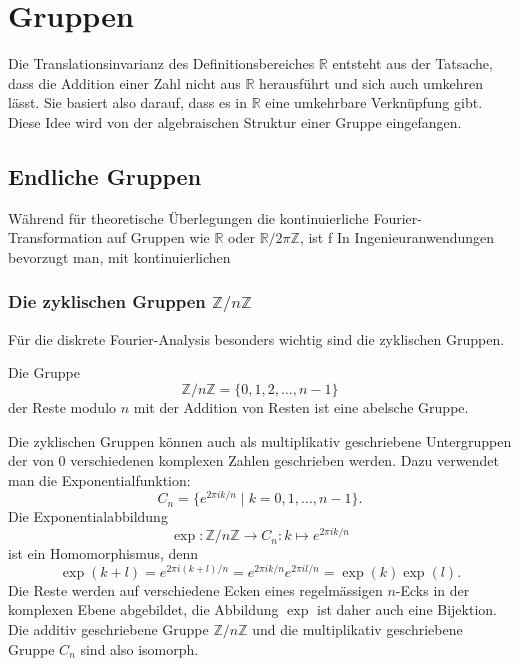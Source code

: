 %
%
%
\section{Gruppen
\label{buch:gruppen:section:gruppe}}
Die Translationsinvarianz des Definitionsbereiches $\mathbb{R}$
entsteht aus der Tatsache, dass die Addition einer Zahl
nicht aus $\mathbb{R}$ herausführt und sich auch umkehren lässt.
Sie basiert also darauf, dass es in $\mathbb{R}$ eine umkehrbare
Verknüpfung gibt.
Diese Idee wird von der algebraischen Struktur einer Gruppe eingefangen.

%
%
\subsection{Endliche Gruppen
\label{buch:gruppen:subsection:endliche-gruppen}}
Während für theoretische Überlegungen die kontinuierliche
Fourier-Transformation auf Gruppen wie $\mathbb{R}$ oder
$\mathbb{R}/2\pi\mathbb{Z}$, ist f
In Ingenieuranwendungen bevorzugt man, mit kontinuierlichen

\subsubsection{Die zyklischen Gruppen $\mathbb{Z}/n\mathbb{Z}$}
Für die diskrete Fourier-Analysis besonders wichtig sind die zyklischen
Gruppen.

\begin{definition}
\label{buch:gruppen:endliche-gruppen:def:zyklisch}
Die Gruppe
\[
\mathbb{Z}/n\mathbb{Z}
=
\{0,1,2,\dots,n-1\}
\]
der Reste modulo $n$ mit der Addition von Resten ist eine abelsche
Gruppe.
\end{definition}

Die zyklischen Gruppen können auch als multiplikativ geschriebene
Untergruppen der von $0$ verschiedenen komplexen Zahlen geschrieben
werden.
Dazu verwendet man die Exponentialfunktion:
\[
C_n
=
\{ e^{2\pi ik/n}\mid k=0,1,\dots,n-1\}.
\]
Die Exponentialabbildung
\[
\exp
\colon
\mathbb{Z}/n\mathbb{Z}
\to
C_n
:
k\mapsto e^{2\pi ik/n}
\]
ist ein Homomorphismus, denn
\[
\exp(k+l)
=
e^{2\pi i(k+l)/n}
=
e^{2\pi ik/n}
e^{2\pi il/n}
=
\exp(k)\exp(l).
\]
Die Reste werden auf verschiedene Ecken eines regelmässigen
$n$-Ecks in der komplexen Ebene abgebildet, die Abbildung $\exp$
ist daher auch eine Bijektion.
Die additiv geschriebene Gruppe $\mathbb{Z}/n\mathbb{Z}$ und
die multiplikativ geschriebene Gruppe $C_n$ sind also isomorph.

